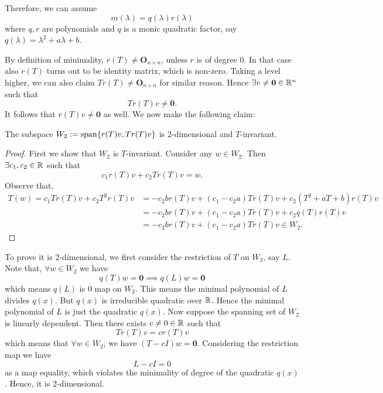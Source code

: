 \documentclass[11pt, a4paper, abstract=true]{scrartcl}
\begin{document}
\begin{soln}
    Therefore, we can assume \[m(\lambda) = q(\lambda)r(\lambda)\] where \(q,r\) are polynomials and \(q\) is a monic quadratic factor, say \(q(\lambda) = \lambda^2 + a\lambda + b\).

    By definition of minimality, \(r(T) \neq \mathbf{O}_{n \times n}\), unless \(r\) is of degree 0. In that case also \(r(T)\) turns out to be identity matrix, which is non-zero. Taking a level higher, we can also claim \(T r(T) \neq \mathbf{O}_{n \times n}\) for similar reason. Hence \(\exists v \neq \mathbf{0} \in \mathbb R^n\) such that \[Tr(T)v \neq \mathbf{0}.\] It follows that \(r(T)v \neq \mathbf{0}\) as well. We now make the following claim:
    \begin{claim*}[3]
        The subspace \(W_2 := \operatorname{span}\{r(T)v, Tr(T)v\}\) is 2-dimensional and \(T\)-invariant.
    \end{claim*}
    \begin{proof}
        First we show that \(W_2\) is \(T\)-invariant. Consider any \(w \in W_2\). Then \(\exists c_1, c_2 \in \mathbb R\) such that \[c_1r(T)v + c_2Tr(T)v = w.\] Observe that, 
        \begin{align*}
            T (w) = c_1Tr(T)v + c_2T^2r(T)v &= - c_2br(T)v + (c_1-c_2a)Tr(T)v + c_2(T^2+aT+b)r(T)v \\ &= - c_2br(T)v + (c_1-c_2a)Tr(T)v + c_2q(T)r(T)v \\ &=  - c_2br(T)v + (c_1-c_2a)Tr(T)v \in W_2.
        \end{align*}
    \end{proof}
    To prove it is 2-dimensional, we first consider the restriction of \(T\) on \(W_2\), say \(L\). Note that, \(\forall w \in W_2\) we have \[q(T)w = \mathbf{0} \implies q(L) w = \mathbf{0}\] which means \(q(L)\) is 0 map on \(W_2\). This means the minimal polynomial of \(L\) divides \(q(x)\). But \(q(x)\) is irreducible quadratic over \(\mathbb R\). Hence the minimal polynomial of \(L\) is just the quadratic \(q(x)\). Now suppose the spanning set of \(W_2\) is linearly dependent. Then there exists \(c \neq 0 \in \mathbb R\) such that \[Tr(T)v = cr(T)v\] which means that \(\forall w \in W_2\), we have \((T-cI)w = \mathbf{0}\). Considering the restriction map we have \[L - cI = 0\] as a map equality, which violates the minimality of degree of the quadratic \(q(x)\).
    Hence, it is 2-dimensional.
    

\end{soln}
\end{document}
